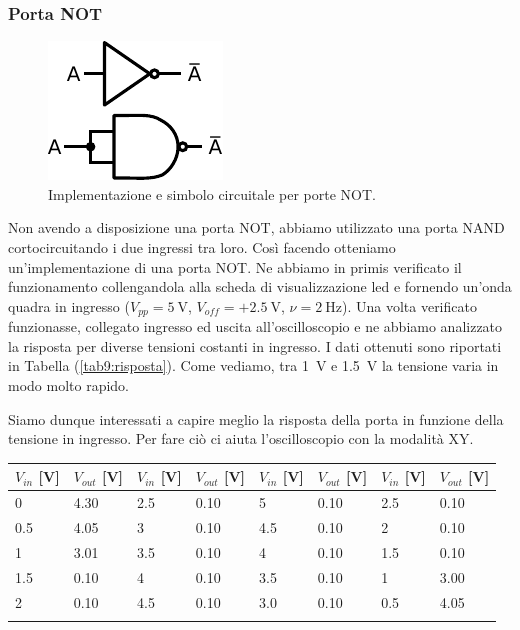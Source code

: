 \subsubsection{Porta NOT}


\begin{figure}
\centering
\includegraphics[width=.15\textwidth]{../E09/latex/NOT.pdf}
\caption{Implementazione e simbolo circuitale per porte NOT.}
\label{cir9:not}
\end{figure}


Non avendo a disposizione una porta NOT, abbiamo utilizzato una porta NAND cortocircuitando i due ingressi tra loro. Così facendo otteniamo un'implementazione di una porta NOT. Ne abbiamo in primis verificato il funzionamento collengandola alla scheda di visualizzazione led e fornendo un'onda quadra in ingresso ($V_{pp}=\SI{5}{\volt}$, $V_{off}=+\SI{2.5}{\volt}$, $\nu=\SI{2}{\hertz}$). Una volta verificato funzionasse, collegato ingresso ed uscita all'oscilloscopio e ne abbiamo analizzato la risposta per diverse tensioni costanti in ingresso. I dati ottenuti sono riportati in Tabella (\ref{tab9:risposta}). Come vediamo, tra \SI{1}{\volt} e \SI{1.5}{\volt} la tensione varia in modo molto rapido.

Siamo dunque interessati a capire meglio la risposta della porta in funzione della tensione in ingresso. Per fare ciò ci aiuta l'oscilloscopio con la modalità XY.  




\begin{tabular}{|l|l|||l|l|||l|l|||l|l|}
\hline
$V_{in}$ [\si{\volt}] & $V_{out}$ [\si{\volt}] & $V_{in}$ [\si{\volt}]& $V_{out}$ [\si{\volt}] & $V_{in}$ [\si{\volt}]& $V_{out}$ [\si{\volt}] & $V_{in}$ [\si{\volt}]& $V_{out}$ [\si{\volt}]\\
\hline
0 & 4.30 & 2.5 & 0.10 & 5  & 0.10 & 2.5 & 0.10\\
\hline
0.5 & 4.05 & 3 & 0.10 & 4.5 & 0.10 & 2 &0.10\\
\hline
1 & 3.01 & 3.5 & 0.10 & 4 & 0.10 & 1.5 & 0.10\\
\hline
1.5 & 0.10 & 4 & 0.10 & 3.5 & 0.10 & 1 & 3.00\\
\hline
2 & 0.10 & 4.5 & 0.10 & 3.0 &0.10 & 0.5 & 4.05\\
\hline
\label{tab9:risposta}
\end{tabular}


